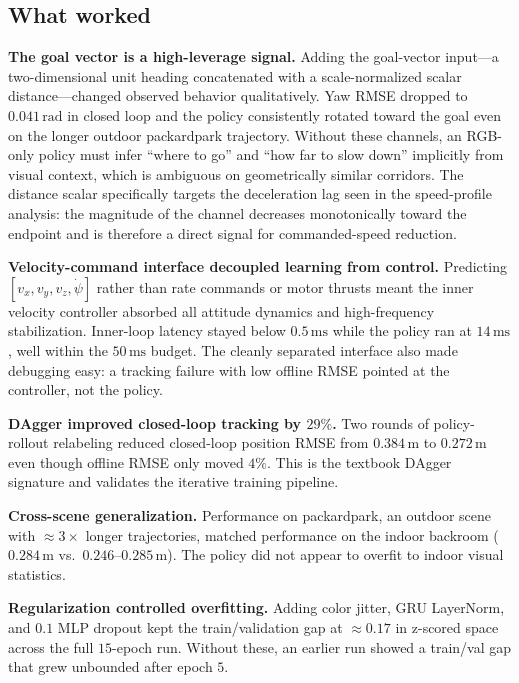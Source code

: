 \documentclass[10pt,twocolumn,letterpaper]{article}
\begin{document}
\subsection{What worked}

\textbf{The goal vector is a high-leverage signal.} Adding the goal-vector input---a two-dimensional unit heading concatenated with a scale-normalized scalar distance---changed observed behavior qualitatively. Yaw RMSE dropped to $0.041\,\mathrm{rad}$ in closed loop and the policy consistently rotated toward the goal even on the longer outdoor packardpark trajectory. Without these channels, an RGB-only policy must infer ``where to go'' and ``how far to slow down'' implicitly from visual context, which is ambiguous on geometrically similar corridors. The distance scalar specifically targets the deceleration lag seen in the speed-profile analysis: the magnitude of the channel decreases monotonically toward the endpoint and is therefore a direct signal for commanded-speed reduction.

\textbf{Velocity-command interface decoupled learning from control.} Predicting $[v_x, v_y, v_z, \dot\psi]$ rather than rate commands or motor thrusts meant the inner velocity controller absorbed all attitude dynamics and high-frequency stabilization. Inner-loop latency stayed below $0.5\,\mathrm{ms}$ while the policy ran at $14\,\mathrm{ms}$, well within the $50\,\mathrm{ms}$ budget. The cleanly separated interface also made debugging easy: a tracking failure with low offline RMSE pointed at the controller, not the policy.

\textbf{DAgger improved closed-loop tracking by $29\%$.} Two rounds of policy-rollout relabeling reduced closed-loop position RMSE from $0.384\,\mathrm{m}$ to $0.272\,\mathrm{m}$ even though offline RMSE only moved $4\%$. This is the textbook DAgger signature and validates the iterative training pipeline.

\textbf{Cross-scene generalization.} Performance on packardpark, an outdoor scene with $\approx 3\times$ longer trajectories, matched performance on the indoor backroom ($0.284\,\mathrm{m}$ vs.\ $0.246$--$0.285\,\mathrm{m}$). The policy did not appear to overfit to indoor visual statistics.

\textbf{Regularization controlled overfitting.} Adding color jitter, GRU LayerNorm, and $0.1$ MLP dropout kept the train/validation gap at $\approx 0.17$ in z-scored space across the full $15$-epoch run. Without these, an earlier run showed a train/val gap that grew unbounded after epoch $5$.
\end{document}
